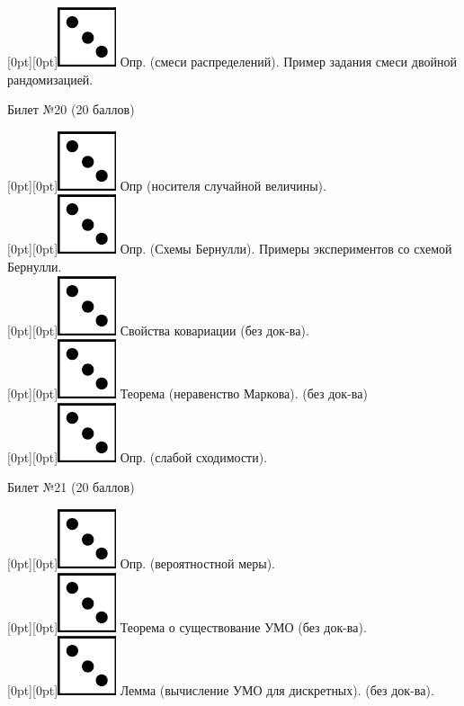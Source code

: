 \documentclass[10pt]{article}
\begin{document}
\raisebox{-1pt}[0pt][0pt]{\includegraphics[width=0.02\linewidth]{3.png}}  Опр. (смеси распределений). Пример задания смеси двойной рандомизацией. \\
\begin{center} {\Large Билет №20 (20 баллов)} \end{center}
\raisebox{-1pt}[0pt][0pt]{\includegraphics[width=0.02\linewidth]{3.png}} Опр (носителя случайной величины). \\
\raisebox{-1pt}[0pt][0pt]{\includegraphics[width=0.02\linewidth]{3.png}} Опр. (Схемы Бернулли). Примеры экспериментов со схемой Бернулли. \\
\raisebox{-1pt}[0pt][0pt]{\includegraphics[width=0.02\linewidth]{3.png}} Свойства ковариации (без док-ва). \\
\raisebox{-1pt}[0pt][0pt]{\includegraphics[width=0.02\linewidth]{3.png}} Теорема (неравенство Маркова). (без док-ва) \\
\raisebox{-1pt}[0pt][0pt]{\includegraphics[width=0.02\linewidth]{3.png}} Опр. (слабой сходимости). \\
\begin{center} {\Large Билет №21 (20 баллов)} \end{center}
\raisebox{-1pt}[0pt][0pt]{\includegraphics[width=0.02\linewidth]{3.png}} Опр. (вероятностной меры). \\
\raisebox{-1pt}[0pt][0pt]{\includegraphics[width=0.02\linewidth]{3.png}} Теорема о существование УМО (без док-ва). \\
\raisebox{-1pt}[0pt][0pt]{\includegraphics[width=0.02\linewidth]{3.png}} Лемма (вычисление УМО для дискретных). (без док-ва). \\
\end{document}
